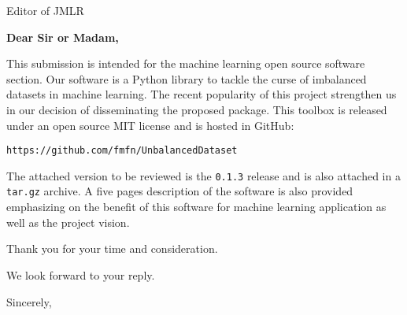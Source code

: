 \documentclass{letter}
\begin{document}

\begin{letter}{Editor of JMLR} %


\opening{\textbf{Dear Sir or Madam,}}

This submission is intended for the machine learning open source software section.
Our software is a Python library to tackle the curse of imbalanced datasets in machine learning.
The recent popularity of this project strengthen us in our decision of disseminating the proposed package. 
This toolbox is released under an open source MIT license and is hosted in GitHub:

\texttt{https://github.com/fmfn/UnbalancedDataset}

The attached version to be reviewed is the \texttt{0.1.3} release and is also attached in a \texttt{tar.gz} archive.
A five pages description of the software is also provided emphasizing on the benefit of this software for machine learning application as well as the project vision.

Thank you for your time and consideration.

We look forward to your reply.

\vspace{2\parskip} %
\closing{Sincerely,}
\vspace{2\parskip} %


\end{letter}
 
\end{document}
